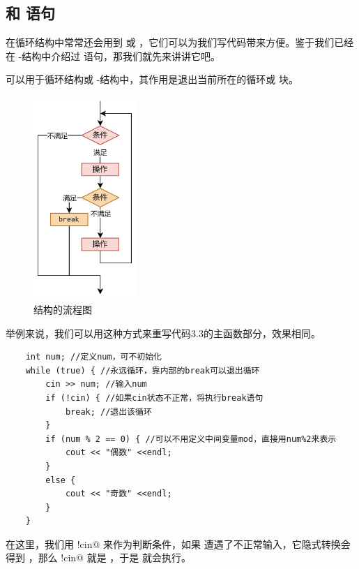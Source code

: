\subsection*{\lstinline@continue@ 和 \lstinline@break@ 语句}
在循环结构中常常还会用到 \lstinline@continue@ 或 \lstinline@break@，它们可以为我们写代码带来方便。鉴于我们已经在 \lstinline@switch@-\lstinline@case@ 结构中介绍过 \lstinline@break@ 语句，那我们就先来讲讲它吧。\par
\lstinline@break@ 可以用于循环结构或 \lstinline@switch@-\lstinline@case@ 结构中，其作用是退出当前所在的循环或 \lstinline@switch@ 块。\par
\begin{figure}[htbp]
    \centering
    \includegraphics[width=0.35\textwidth]{../images/generalized_parts/03_structure_of_break.drawio.png}
    \caption{\lstinline@break@ 结构的流程图}
\end{figure}
举例来说，我们可以用这种方式来重写代码3.3的主函数部分，效果相同。
\begin{lstlisting}
    int num; //定义num，可不初始化
    while (true) { //永远循环，靠内部的break可以退出循环
        cin >> num; //输入num
        if (!cin) { //如果cin状态不正常，将执行break语句
            break; //退出该循环
        }
        if (num % 2 == 0) { //可以不用定义中间变量mod，直接用num%2来表示
            cout << "偶数" <<endl;
        }
        else {
            cout << "奇数" <<endl;
        }
    }
\end{lstlisting}
在这里，我们用 \lstinline@!cin@ 来作为判断条件，如果 \lstinline@cin@ 遭遇了不正常输入，它隐式转换会得到 \lstinline@false@，那么 \lstinline@!cin@ 就是 \lstinline@true@，于是 \lstinline@break@ 就会执行。\par
